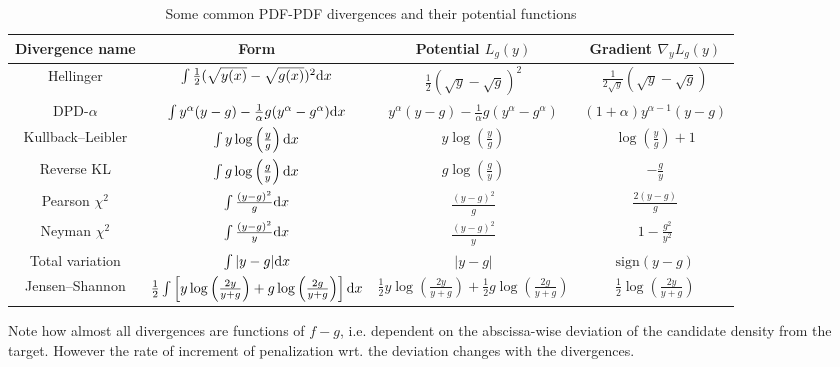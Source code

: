 \begin{table}[h!]
	\begin{tabular}{c|c|c|c}
		Divergence name  &  Form  &  Potential $L_g(y)$  &  Gradient $\nabla_y L_g(y)$\\
		\hline \vspace{0.1cm}
		
		Hellinger
		&
		$\int \frac{1}{2} (\sqrt{y(x)} - \sqrt{g(x)})^2 \mathrm d x$
		&
		$\frac{1}{2} (\sqrt y - \sqrt g)^2$
		&
		$\frac{1}{2 \sqrt y} (\sqrt y - \sqrt g)$
		\\
		
		DPD-\texorpdfstring{$\alpha$}{alpha}
		&
		$\int y^\alpha(y-g) - \frac{1}{\alpha}g(y^\alpha - g^\alpha) \mathrm d x$
		&
		$y^\alpha(y-g) - \frac{1}{\alpha}g(y^\alpha - g^\alpha)$
		&
		$(1+\alpha) y^{\alpha-1} (y-g)$
		\\
		
		Kullback--Leibler
		&
		$\int y \log \left(\frac{y}{g}\right) \mathrm d x$
		&
		$y \log \left(\frac{y}{g}\right)$
		&
		$\log \left(\frac{y}{g}\right) + 1$
		\\
		
		Reverse KL
		&
		$\int g \log \left(\frac{g}{y}\right) \mathrm d x$
		&
		$g \log \left(\frac{g}{y}\right)$
		&
		$-\frac{g}{y}$
		\\
		
		Pearson $\chi^2$
		&
		$\int \frac{(y-g)^2}{g} \mathrm d x$
		&
		$\frac{(y-g)^2}{g}$
		&
		$\frac{2(y-g)}{g}$
		\\
		
		Neyman $\chi^2$
		&
		$\int \frac{(y-g)^2}{y} \mathrm d x$
		&
		$\frac{(y-g)^2}{y}$
		&
		$1-\frac{g^2}{y^2}$
		\\
		
		Total variation
		&
		$\int |y-g| \mathrm d x$
		&
		$|y-g|$
		&
		$\mathrm{sign}(y-g)$
		\\
		
		Jensen--Shannon
		&
		$\frac12 \int \left[ y \log \left(\frac{2y}{y+g}\right)
		+ g \log \left(\frac{2g}{y+g}\right) \right]\mathrm d x$
		&
		$\frac12 y \log \left(\frac{2y}{y+g}\right)
		+\frac12 g \log \left(\frac{2g}{y+g}\right)$
		&
		$\frac12 \log \left(\frac{2y}{y+g}\right)$
		\\
		
	\end{tabular}
	\caption{Some common PDF-PDF divergences and their potential functions}
	\label{tab:pdfpotlist}
\end{table}

Note how almost all divergences are functions of $f-g$, i.e. dependent on the abscissa-wise deviation of the candidate density from the target. However the rate of increment of penalization wrt. the deviation changes with the divergences.

